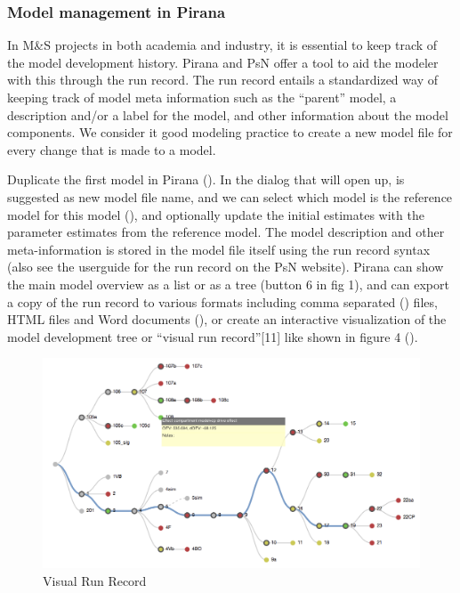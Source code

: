\subsubsection{Model management in Pirana}
In M\&S projects in both academia and industry, it is essential to
keep track of the model development history. Pirana and PsN offer a
tool to aid the modeler with this through the run record. The run
record entails a standardized way of keeping track of model meta
information such as the “parent” model, a description and/or a label
for the model, and other information about the model components. We
consider it good modeling practice to create a new model file for
every change that is made to a model. 

Duplicate the first model in Pirana (). In the dialog
that will open up,  is suggested as new model file name, and
we can select which model is the reference model for this model
(), and optionally update the initial estimates with the
parameter estimates from the reference model. The model description
and other meta-information is stored in the model file itself using
the run record syntax (also see the userguide for the run record on
the PsN website). Pirana can show the main model overview as a list or
as a tree (button 6 in fig 1), and can export a copy of the run record
to various formats including comma separated () files, HTML files
and Word documents (), or create an
interactive visualization of the model development tree or “visual run
record”[11] like shown in figure 4 ().

\begin{figure}[H] \centering
    \includegraphics[scale=0.3]{images/fig4_vrr.png}
    \caption{Visual Run Record}
\end{figure}

